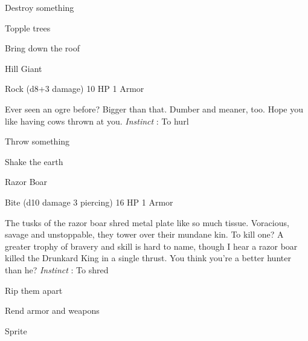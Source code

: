 \startitemize[1,packed]
         
\item Destroy something

         
\item Topple trees

         
\item Bring down the roof

       
\stopitemize
       
\startMonsterName
Hill Giant	 
\stopMonsterName
       

Rock (d8+3 damage)	10 HP	1 Armor

       


       
\startMonsterDescription
Ever seen an ogre before? Bigger than that. Dumber and meaner, too. Hope you like having cows thrown at you. {\em Instinct} : To hurl
\stopMonsterDescription
       
\startitemize[1,packed]
         
\item Throw something

         
\item Shake the earth

       
\stopitemize
       
\startMonsterName
Razor Boar	 
\stopMonsterName
       

Bite (d10 damage 3 piercing)	16 HP	1 Armor

       


       
\startMonsterDescription
The tusks of the razor boar shred metal plate like so much tissue. Voracious, savage and unstoppable, they tower over their mundane kin. To kill one? A greater trophy of bravery and skill is hard to name, though I hear a razor boar killed the Drunkard King in a single thrust. You think you’re a better hunter than he? {\em Instinct} : To shred
\stopMonsterDescription
       
\startitemize[1,packed]
         
\item Rip them apart

         
\item Rend armor and weapons

       
\stopitemize
       
\startMonsterName
Sprite	 
\stopMonsterName
       


